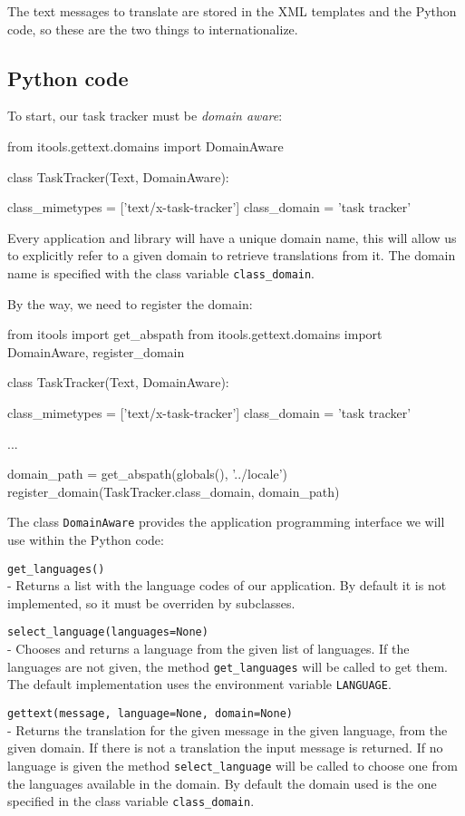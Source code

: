 The text messages to translate are stored in the XML templates and the Python
code, so these are the two things to internationalize.

\subsection{Python code}

To start, our task tracker must be {\em domain aware}:

\begin{code}
    from itools.gettext.domains import DomainAware

    class TaskTracker(Text, DomainAware):

        class_mimetypes = ['text/x-task-tracker']
        class_domain = 'task tracker'
\end{code}

Every application and library will have a unique domain name, this will
allow us to explicitly refer to a given domain to retrieve translations
from it. The domain name is specified with the class variable
{\tt class\_domain}.

By the way, we need to register the domain:

\begin{code}
    from itools import get_abspath
    from itools.gettext.domains import DomainAware, register_domain

    class TaskTracker(Text, DomainAware):

        class_mimetypes = ['text/x-task-tracker']
        class_domain = 'task tracker'

    ...

    domain_path = get_abspath(globals(), '../locale')
    register_domain(TaskTracker.class_domain, domain_path)
\end{code}

The class {\tt DomainAware} provides the application programming interface
we will use within the Python code:

\begin{api}
  {\tt get\_languages()}\\
  - Returns a list with the language codes of our application. By default it
    is not implemented, so it must be overriden by subclasses.

  {\tt select\_language(languages=None)}\\
  - Chooses and returns a language from the given list of languages. If the
    languages are not given, the method {\tt get\_languages} will be called
    to get them. The default implementation uses the environment variable
    {\tt LANGUAGE}.

  {\tt gettext(message, language=None, domain=None)}\\
  - Returns the translation for the given message in the given language,
    from the given domain. If there is not a translation the input message
    is returned. If no language is given the method {\tt select\_language}
    will be called to choose one from the languages available in the
    domain. By default the domain used is the one specified in the class
    variable {\tt class\_domain}.
\end{api}

